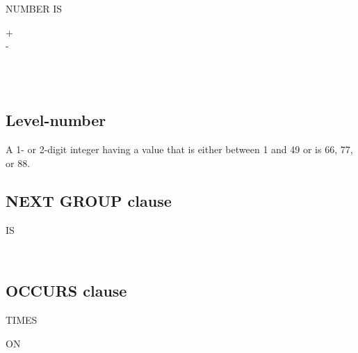  NUMBER IS
\begin{0-1}
    + \\
    - \\
     \\
\end{0-1}
\begin{1=}
  \identifier \\
  \integer
\end{1=}

\subsection{Level-number}

A 1- or 2-digit integer having a value that is either between 1 and 49 or is 66, 77,  or 88.

\subsection{NEXT GROUP clause}
  IS
\begin{1=}
  \begin{0-1}
  \end{0-1}
  \integer \\
   
\end{1=}

\subsection{OCCURS clause}


\begin{1=}
  \integer
  \begin{0-1}
     \integer
  \end{0-1}
  TIMES
  \begin{0-1}
     ON \identifier
  \end{0-1} \\

\end{1=}

